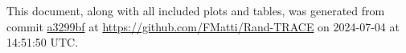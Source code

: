 This document, along with all included plots and tables, was generated from commit \href{https://github.com/FMatti/Rand-TRACE/tree/a3299bf}{a3299bf} at \url{https://github.com/FMatti/Rand-TRACE} on 2024-07-04 at 14:51:50 UTC.
